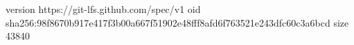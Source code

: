 version https://git-lfs.github.com/spec/v1
oid sha256:98f8670b917e417f3b00a667f51902e48fff8afd6f763521e243dfc60c3a6bcd
size 43840
